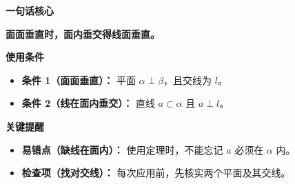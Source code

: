 \begin{summarybox}
	\textbf{\textcolor{CSummary}{一句话核心}}

	\textbf{面面垂直时，面内垂交得线面垂直。}

	\medskip
	\textbf{\textcolor{CSummary}{使用条件}}
	\begin{itemize}[leftmargin=*, itemsep=0.5em, topsep=0.4em]
		\item \textbf{条件 1（面面垂直）：} 平面 $\alpha\perp\beta$，且交线为 $l$。
		\item \textbf{条件 2（线在面内垂交）：} 直线 $a\subset\alpha$ 且 $a\perp l$。
	\end{itemize}

	\medskip
	\textbf{\textcolor{CSummary}{关键提醒}}
	\begin{itemize}[leftmargin=*, itemsep=0.5em, topsep=0.4em]
		\item \textbf{易错点（缺线在面内）：} 使用定理时，不能忘记 $a$ 必须在 $\alpha$ 内。
		\item \textbf{检查项（找对交线）：} 每次应用前，先核实两个平面及其交线。
	\end{itemize}
\end{summarybox}
